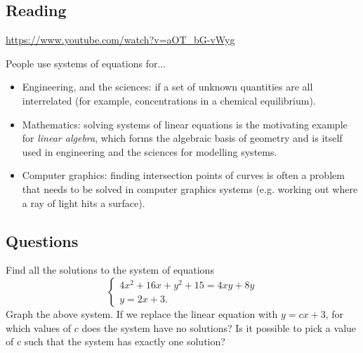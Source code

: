 



\subsection*{Reading}
\begin{center}
\begin{tcolorbox}[width=0.8\textwidth,colback={white},title={\textbf{Go and watch...}},colbacktitle=black,coltitle=white]
  \textcolor{black}{\url{https://www.youtube.com/watch?v=aOT_bG-vWyg}}
\end{tcolorbox}
\end{center}

\begin{center}
\begin{tcolorbox}[width=0.8\textwidth,colback={white},title={\textbf{What's it good for?}},colbacktitle=MidnightBlue,coltitle=white]
  People use systems of equations for...
  \begin{itemize}
    \item Engineering, and the sciences: if a set of unknown quantities are all interrelated (for example, concentrations in a chemical equilibrium).
    \item Mathematics: solving systems of linear equations is the motivating example for \emph{linear algebra}, which forms the algebraic basis
          of geometry and is itself used in engineering and the sciences for modelling systems.
    \item Computer graphics: finding intersection points of curves is often a problem that needs to be solved in computer graphics systems (e.g.
          working out where a ray of light hits a surface).
  \end{itemize}
\end{tcolorbox}
\end{center}

\subsection*{Questions}
\begin{questions}
  \question Find all the solutions to the system of equations
    \begin{displaymath}
      \begin{cases}
        4x^2 + 16x + y^2 + 15 = 4xy + 8y\\
        y = 2x + 3.
      \end{cases}
    \end{displaymath}
  \question Graph the above system. If we replace the linear equation with $ y = cx + 3 $, for which values of $ c $ does the
            system have no solutions? Is it possible to pick a value of $ c $ such that the system has exactly one solution?
\end{questions}


